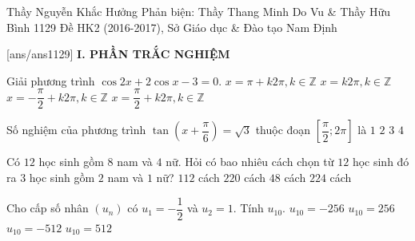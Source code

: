 \begin{name}
{Thầy Nguyễn Khắc Hưởng \newline Phản biện: Thầy Thang Minh Do Vu \& Thầy Hữu Bình}
{1129 Đề HK2 (2016-2017), Sở Giáo dục \& Đào tạo Nam Định}
	\end{name}
	\setcounter{ex}{0}\setcounter{bt}{0}
	[ans/ans1129]
\noindent\textbf{I. PHẦN TRẮC NGHIỆM}
\begin{ex}%
	Giải phương trình $\cos 2x+2\cos x-3=0$.
	\choice
	{$x=\pi+k2\pi,k\in\mathbb{Z}$}
	{\True $x=k2\pi,k\in\mathbb{Z}$}
	{$x=-\dfrac{\pi}{2}+k2\pi,k\in\mathbb{Z}$}
	{$x=\dfrac{\pi}{2}+k2\pi,k\in\mathbb{Z}$}
\end{ex}

\begin{ex}%
	Số nghiệm của phương trình $\tan\left(x+\dfrac{\pi}{6}\right)=\sqrt{3}$ thuộc đoạn $\left[\dfrac{\pi}{2};2\pi\right]$ là
	\choice
	{\True $1$}
	{$2$}
	{$3$}
	{$4$}
\end{ex}

\begin{ex}%
	Có $12$ học sinh gồm $8$ nam và $4$ nữ. Hỏi có bao nhiêu cách chọn từ $12$ học sinh đó ra $3$ học sinh gồm $2$ nam và $1$ nữ?
	\choice
	{\True $112$ cách}
	{$220$ cách}
	{$48$ cách}
	{$224$ cách}
\end{ex}

\begin{ex}%
	Cho cấp số nhân $(u_n)$ có $u_1=-\dfrac{1}{2}$ và $u_2=1$. Tính $u_{10}$.
	\choice
	{$u_{10}=-256$}
	{\True $u_{10}=256$}
	{$u_{10}=-512$}
	{$u_{10}=512$}
\end{ex}

